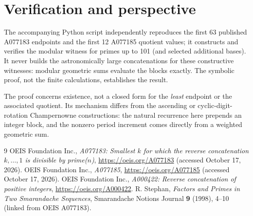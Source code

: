 \documentclass[9pt]{extarticle}
\begin{document}
\section{Verification and perspective}
The accompanying Python script independently reproduces the first
63 published A077183 endpoints and the first 12 A077185 quotient
values; it constructs and verifies the modular witness for primes up
to 101 (and selected additional bases). It never builds the
astronomically large concatenations for these constructive witnesses:
modular geometric sums evaluate the blocks exactly. The symbolic
proof, not the finite calculations, establishes the result.

The proof concerns existence, not a closed form for the \emph{least}
endpoint or the associated quotient. Its mechanism differs from the
ascending or cyclic-digit-rotation Champernowne constructions: the
natural recurrence here prepends an integer block, and the nonzero
period increment comes directly from a weighted geometric sum.

\begin{thebibliography}{9}
 OEIS Foundation Inc., \emph{A077183: Smallest $k$
for which the reverse concatenation $k,\ldots,1$ is divisible by
prime($n$)}, \url{https://oeis.org/A077183} (accessed October 17, 2026).
 OEIS Foundation Inc., \emph{A077185},
\url{https://oeis.org/A077185} (accessed October 17, 2026).
 OEIS Foundation Inc., \emph{A000422: Reverse
concatenation of positive integers},
\url{https://oeis.org/A000422}.
 R. Stephan, \emph{Factors and Primes in Two
Smarandache Sequences}, Smarandache Notions Journal \textbf{9}
(1998), 4--10 (linked from OEIS A077183).
\end{thebibliography}
\end{document}
